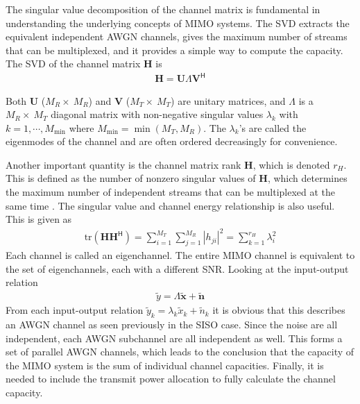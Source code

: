 The singular value decomposition of the channel matrix is fundamental in understanding the underlying concepts of MIMO systems. The SVD extracts the equivalent independent AWGN channels, gives the maximum number of streams that can be multiplexed, and it provides a simple way to compute the capacity. The SVD of the channel matrix $\mathbf{H}$ is \cite{Tim2012Practical}
\begin{align}%
  \mathbf{H} = \mathbf{U} \Lambda \mathbf{V}^{\mathsf{H}} 
\end{align}
 
Both $\mathbf{U}$ ($M_R \times \ M_R$) and $\mathbf{V}$ ($M_T \times \ M_T$) are unitary matrices, and $\Lambda$ is a  $M_R \times \ M_T$ diagonal matrix with non-negative singular values $\lambda_k$ with $k=1, \cdots, M_{\text{min}}$ where $M_{\text{min}} = \min(M_T,M_R)$. The $\lambda_k$'s are called the eigenmodes of the channel and are often ordered decreasingly for convenience.

Another important quantity is the channel matrix rank $\mathbf{H}$, which is denoted $r_H$. This is defined as the number of nonzero singular values of $\mathbf{H}$, which determines the maximum number of independent streams that can be multiplexed at the same time \cite{Tim2012Practical}. The singular value and channel energy relationship is also useful. This is given as 
\begin{align} %
  \text{tr}(\mathbf{H} \mathbf{H}^{\mathsf{H}}) = \sum_{i=1}^{M_T} \sum_{j=1}^{M_R} |h_{ji}|^2 = \sum_{k=1}^{r_H} \lambda_i^2
\end{align}
Each channel is called an eigenchannel. The entire MIMO channel is equivalent to the set of eigenchannels, each with a different SNR. Looking at the input-output relation \cite{Tim2012Practical}
\begin{align}%
  \tilde{y} = \Lambda\mathbf{ \tilde{x}} + \mathbf{\tilde{n}}
\end{align}
From each input-output relation $\tilde{y}_k = \lambda_k \tilde{x}_k + \tilde{n}_k$ it is obvious that this describes an AWGN channel as seen previously in the SISO case. Since the noise are all independent, each AWGN subchannel are all independent as well. This forms a set of parallel AWGN channels, which leads to the conclusion that the capacity of the MIMO system is the sum of individual channel capacities. Finally, it is needed to include the transmit power allocation to fully calculate the channel capacity.

